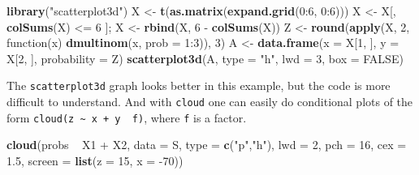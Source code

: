 \documentclass[]{book}
\newenvironment{Shaded}{\begin{snugshade}}{\end{snugshade}}
\newcommand{\KeywordTok}[1]{\textcolor[rgb]{0.13,0.29,0.53}{\textbf{{#1}}}}
\newcommand{\DataTypeTok}[1]{\textcolor[rgb]{0.13,0.29,0.53}{{#1}}}
\newcommand{\DecValTok}[1]{\textcolor[rgb]{0.00,0.00,0.81}{{#1}}}
\newcommand{\FloatTok}[1]{\textcolor[rgb]{0.00,0.00,0.81}{{#1}}}
\newcommand{\StringTok}[1]{\textcolor[rgb]{0.31,0.60,0.02}{{#1}}}
\newcommand{\OtherTok}[1]{\textcolor[rgb]{0.56,0.35,0.01}{{#1}}}
\newcommand{\NormalTok}[1]{{#1}}
\numberwithin{equation}{chapter}
\numberwithin{figure}{chapter}
\theoremstyle{plain}
\theoremstyle{definition}
\theoremstyle{remark}
\theoremstyle{definition}
\theoremstyle{definition}
\theoremstyle{remark}
\begin{document}
\begin{Shaded}
\begin{Highlighting}[]
\KeywordTok{library}\NormalTok{(}\StringTok{"scatterplot3d"}\NormalTok{)}
\NormalTok{X <-}\StringTok{ }\KeywordTok{t}\NormalTok{(}\KeywordTok{as.matrix}\NormalTok{(}\KeywordTok{expand.grid}\NormalTok{(}\DecValTok{0}\NormalTok{:}\DecValTok{6}\NormalTok{, }\DecValTok{0}\NormalTok{:}\DecValTok{6}\NormalTok{)))}
\NormalTok{X <-}\StringTok{ }\NormalTok{X[, }\KeywordTok{colSums}\NormalTok{(X) <=}\StringTok{ }\DecValTok{6} \NormalTok{]; X <-}\StringTok{ }\KeywordTok{rbind}\NormalTok{(X, }\DecValTok{6} \NormalTok{-}\StringTok{ }\KeywordTok{colSums}\NormalTok{(X))}
\NormalTok{Z <-}\StringTok{ }\KeywordTok{round}\NormalTok{(}\KeywordTok{apply}\NormalTok{(X, }\DecValTok{2}\NormalTok{, function(x) }\KeywordTok{dmultinom}\NormalTok{(x, }\DataTypeTok{prob =} \DecValTok{1}\NormalTok{:}\DecValTok{3}\NormalTok{)), }\DecValTok{3}\NormalTok{)}
\NormalTok{A <-}\StringTok{ }\KeywordTok{data.frame}\NormalTok{(}\DataTypeTok{x =} \NormalTok{X[}\DecValTok{1}\NormalTok{, ], }\DataTypeTok{y =} \NormalTok{X[}\DecValTok{2}\NormalTok{, ], }\DataTypeTok{probability =} \NormalTok{Z)}
\KeywordTok{scatterplot3d}\NormalTok{(A, }\DataTypeTok{type =} \StringTok{"h"}\NormalTok{, }\DataTypeTok{lwd =} \DecValTok{3}\NormalTok{, }\DataTypeTok{box =} \OtherTok{FALSE}\NormalTok{)}
\end{Highlighting}
\end{Shaded}

The \texttt{scatterplot3d} graph looks better in this example, but the
code is more difficult to understand. And with \texttt{cloud} one can
easily do conditional plots of the form
\texttt{cloud(z\ \textasciitilde{}\ x\ +\ y\ \textbar{}\ f)}, where
\texttt{f} is a factor.

\begin{Shaded}
\begin{Highlighting}[]
\KeywordTok{cloud}\NormalTok{(probs ~}\StringTok{ }\NormalTok{X1 +}\StringTok{ }\NormalTok{X2, }\DataTypeTok{data =} \NormalTok{S, }\DataTypeTok{type =} \KeywordTok{c}\NormalTok{(}\StringTok{"p"}\NormalTok{,}\StringTok{"h"}\NormalTok{), }\DataTypeTok{lwd =} \DecValTok{2}\NormalTok{, }
            \DataTypeTok{pch =} \DecValTok{16}\NormalTok{, }\DataTypeTok{cex =} \FloatTok{1.5}\NormalTok{, }\DataTypeTok{screen =} \KeywordTok{list}\NormalTok{(}\DataTypeTok{z =} \DecValTok{15}\NormalTok{, }\DataTypeTok{x =} \NormalTok{-}\DecValTok{70}\NormalTok{))}
\end{Highlighting}
\end{Shaded}
\end{document}
